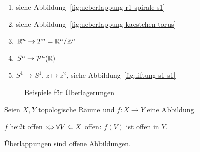 \begin{beispiel}
    \begin{enumerate}[label=\arabic*)]
        \item siehe Abbildung~\ref{fig:ueberlappung-r1-spirale-s1}
        \item siehe Abbildung~\ref{fig:ueberlappung-kaestchen-torus}
        \item $\mathbb{R}^n \rightarrow T^n = \mathbb{R}^n / \mathbb{Z}^n$
        \item $S^n \rightarrow \mathcal{P}^n(\mathbb{R})$
        \item $S^1 \rightarrow S^1$, $z \mapsto z^2$, siehe Abbildung~\ref{fig:liftung-s1-s1}
    \end{enumerate}

    \begin{figure}[ht]
        \centering
        \label{Formen}
        \caption{Beispiele für Überlagerungen}
    \end{figure}
\end{beispiel}

\begin{definition}
    Seien $X, Y$ topologische Räume und $f:X \rightarrow Y$ eine 
    Abbildung.

    $f$ heißt offen $:\Leftrightarrow \forall V \subseteq X$ offen: $f(V)$ ist offen in $Y$.
\end{definition}

\begin{korollar} %
    Überlappungen sind offene Abbildungen.
\end{korollar}

